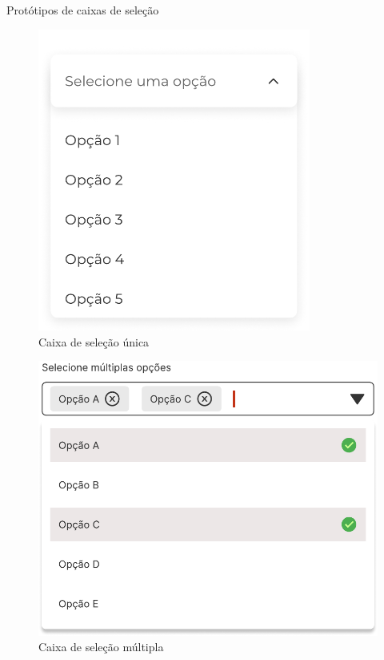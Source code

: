\begin{MyCenteredFigure} \caption{Protótipos de caixas de seleção} \label{fig:selects}
  \begin{subfigure}[b]{0.45\textwidth} \centering
    \includegraphics[width=0.8\textwidth]{files/img/2.02!5-desenvolvimento/2.02!5.1.3-prototipagem/2.02!5.1.3.1-componentes/SingleSelect}
    \caption{Caixa de seleção única} \label{fig:SingleSelect}
  \end{subfigure}
  \hfill
  \begin{subfigure}[b]{0.45\textwidth} \centering
    \includegraphics[width=\textwidth]{files/img/2.02!5-desenvolvimento/2.02!5.1.3-prototipagem/2.02!5.1.3.1-componentes/MultiSelect}
    \caption{Caixa de seleção múltipla} \label{fig:MultiSelect}
  \end{subfigure}
\end{MyCenteredFigure}

